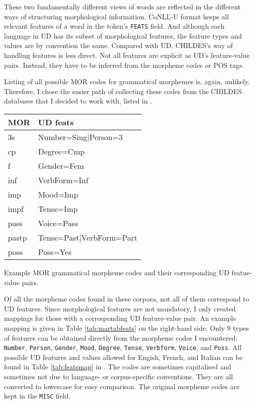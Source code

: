 These two fundamentally different views of words are reflected in the different ways of structuring morphological information. CoNLL-U format keeps all relevant features of a word in the token's \texttt{FEATS} field. And although each language in UD has its subset of morphological features, the feature types and values are by convention the same. Compared with UD, CHILDES's way of handling features is less direct. Not all features are explicit as UD's feature-value pairs. Instead, they have to be inferred from the morpheme codes or POS tags.

Listing of all possible MOR codes for grammatical morphemes is, again, unlikely. Therefore, I chose the easier path of collecting these codes from the CHILDES databases that I decided to work with, listed in .
\begin{margintable}[1\baselineskip]
\begin{tabularx}{1\textwidth}{@{}ll@{}}
\toprule
\textbf{MOR} & \textbf{UD feats}\\ \midrule
	3s & Number=Sing|Person=3\\
	cp & Degree=Cmp\\
	f & Gender=Fem\\
	inf & VerbForm=Inf\\
	imp & Mood=Imp\\
	impf & Tense=Imp\\
	pass & Voice=Pass\\
	pastp & Tense=Past|VerbForm=Part\\
	poss & Poss=Yes\\\bottomrule
\end{tabularx}
\caption{\label{tab:martabfeats}Example MOR grammatical morpheme codes and their corresponding UD featue-value pairs.}
\footnotesize
\end{margintable}
Of all the morpheme codes found in these corpora, not all of them correspond to UD features. Since morphological features are not mandatory, I only created mappings for those with a corresponding UD feature-value pair. An example mapping is given in Table \ref{tab:martabfeats} on the right-hand side. Only 9 types of features can be obtained directly from the morpheme codes I encountered: \texttt{Number}, \texttt{Person}, \texttt{Gender}, \texttt{Mood}, \texttt{Degree}, \texttt{Tense}, \texttt{Verbform}, \texttt{Voice}, and \texttt{Poss}. All possible UD features and values allowed for Engish, French, and Italian can be found in Table \ref{tab:featsmap} in . The codes are sometimes capitalised and sometimes not due to language- or corpus-specific conventions. They are all converted to lowercase for easy comparison. The original morpheme codes are kept in the \texttt{MISC} field.

